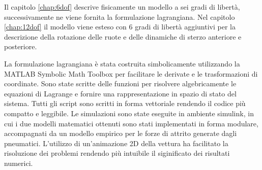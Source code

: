 Il capitolo \ref{chap:6dof} descrive fisicamente un modello a sei gradi di libertà, successivamente ne viene fornita la formulazione lagrangiana. Nel capitolo \ref{chap:12dof} il modello viene esteso con 6 gradi di libertà aggiuntivi per la descrizione della rotazione delle ruote e delle dinamiche di sterzo anteriore e posteriore.

La formulazione lagrangiana è stata costruita simbolicamente utilizzando la  MATLAB Symbolic Math Toolbox per facilitare le derivate e le trasformazioni di coordinate.
Sono state scritte delle funzioni per risolvere algebricamente le equazioni di Lagrange e fornire una rappresentazione in spazio di stato del sistema.
Tutti gli script sono scritti in forma vettoriale rendendo il codice più compatto e leggibile.
Le simulazioni sono state eseguite in ambiente simulink, in cui i due modelli matematici ottenuti sono stati implementati in forma modulare, accompagnati da un modello empirico per le forze di attrito generate dagli pneumatici.
L'utilizzo di un'animazione 2D della vettura ha facilitato la risoluzione dei problemi rendendo più intuibile il siginificato dei risultati numerici.
